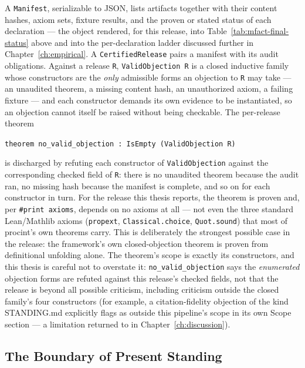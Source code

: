 A \texttt{Manifest}, serializable to JSON, lists artifacts together with
their content hashes, axiom sets, fixture results, and the proven or
stated status of each declaration --- the object rendered, for this
release, into Table~\ref{tab:mfact-final-status} above and into the
per-declaration ladder discussed further in Chapter~\ref{ch:empirical}.
A \texttt{CertifiedRelease} pairs a manifest with its audit obligations.
Against a release \texttt{R}, \texttt{ValidObjection R} is a closed
inductive family whose constructors are the \emph{only} admissible forms
an objection to \texttt{R} may take --- an unaudited theorem, a missing
content hash, an unauthorized axiom, a failing fixture --- and each
constructor demands its own evidence to be instantiated, so an objection
cannot itself be raised without being checkable. The per-release theorem
\begin{center}
\texttt{theorem no\_valid\_objection : IsEmpty (ValidObjection R)}
\end{center}
is discharged by refuting each constructor of \texttt{ValidObjection}
against the corresponding checked field of \texttt{R}: there is no
unaudited theorem because the audit ran, no missing hash because the
manifest is complete, and so on for each constructor in turn. For the
release this thesis reports, the theorem is proven and, per
\texttt{\#print axioms}, depends on no axioms at all --- not even the
three standard Lean/Mathlib axioms (\texttt{propext},
\texttt{Classical.choice}, \texttt{Quot.sound}) that most of
\textsf{procint}'s own theorems carry. This is deliberately the
strongest possible case in the release: the framework's own
closed-objection theorem is proven from definitional unfolding alone.
The theorem's scope is exactly its constructors, and this thesis is
careful not to overstate it: \texttt{no\_valid\_objection} says the
\emph{enumerated} objection forms are refuted against this release's
checked fields, not that the release is beyond all possible criticism,
including criticism outside the closed family's four constructors (for
example, a citation-fidelity objection of the kind STANDING.md
explicitly flags as outside this pipeline's scope in its own Scope
section --- a limitation returned to in Chapter~\ref{ch:discussion}).

\subsection{The Boundary of Present Standing}
\label{sec:mfact-boundary}

